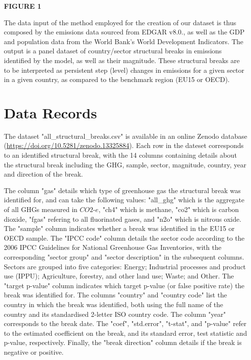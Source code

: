 \documentclass[a4paper]{article}
\begin{document}
\bigskip
\begin{center}
    \textbf{FIGURE 1}
\end{center}

The data input of the method employed for the creation of our dataset is thus composed by the emissions data sourced from EDGAR v8.0., as well as the GDP and population data from the World Bank's World Development Indicators. The output is a panel dataset of country/sector structural breaks in emissions identified by the model, as well as their magnitude. These structural breaks are to be interpreted as persistent step (level) changes in emissions for a given sector in a given country, as compared to the benchmark region (EU15 or OECD).



\section*{Data Records}

The dataset "all\_structural\_breaks.csv" is available in an online Zenodo database (\url{https://doi.org/10.5281/zenodo.13325884}). \cite{breaks_database} Each row in the dateset corresponds to an identified structural break, with the 14 columns containing details about the structural break including the GHG, sample, sector, magnitude, country, year and direction of the break.

The column "gas" details which type of greenhouse gas the structural break was identified for, and can take the following values: "all\_ghg" which is the aggregate of all GHGs measured in $CO2$-$e$, "ch4" which is methane, "co2" which is carbon dioxide, "fgas" refering to all fluorinated gases, and "n2o" which is nitrous oxide. The "sample" column indicates whether a break was identified in the EU15 or OECD sample. The "IPCC code" column details the sector code according to the 2006 IPCC Guidelines for National Greenhouse Gas Inventories, with the corresponding "sector group" and "sector description" in the subsequent columns. Sectors are grouped into five categories: Energy; Industrial processes and product use (IPPU); Agriculture, forestry, and other land use; Waste; and Other. The "target p-value" column indicates which target p-value (or false positive rate) the break was identified for. The columns "country" and "country code" list the country in which the break was identified, both using the full name of the country and its standardised 2-letter ISO country code. The column "year" corresponds to the break date. The "coef", "std.error", "t-stat", and "p-value" refer to the estimated coefficient on the break, and its standard error, test statistic and p-value, respectively. Finally, the "break direction" column details if the break is negative or positive.
\end{document}
